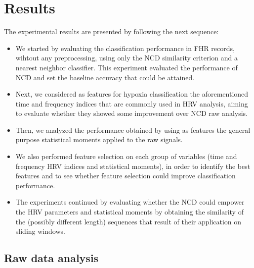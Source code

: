 \section{Results}
\label{sec:experiments}

The experimental results are presented by following the next sequence:
\begin{itemize}
\item  We started by evaluating the classification performance in FHR records, wihtout any preprocessing, using only the NCD similarity criterion and a nearest neighbor classifier. This experiment evaluated the performance of NCD and set the baseline accuracy that could be attained. 

\item Next, we considered as features for hypoxia classification the aforementioned time and frequency indices that are commonly used in HRV analysis, aiming to evaluate whether they showed some improvement over NCD raw analysis. 

\item Then, we analyzed the performance obtained by using as features the general purpose statistical moments applied to the raw signals. 

\item We also performed feature selection on each group of variables (time and frequency HRV indices and statistical moments), in order to identify the best features and to see whether feature selection could improve classification performance.

\item The experiments continued by evaluating whether the NCD could empower the HRV parameters and statistical moments by obtaining the similarity of the (possibly different length) sequences that result of their application on sliding windows. 


\end{itemize}

\subsection{Raw data analysis}

